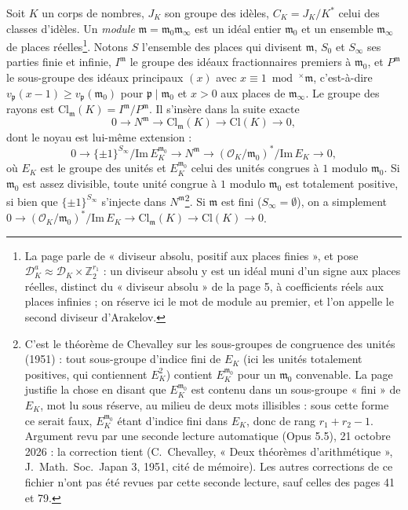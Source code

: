 \documentclass[11pt,a4paper]{article}
\begin{document}
Soit $K$ un corps de nombres, $J_K$ son groupe des idèles, $C_K = J_K/K^{*}$
celui des classes d'idèles. Un \emph{module} $\mathfrak{m} = \mathfrak{m}_0
\mathfrak{m}_\infty$ est un idéal entier $\mathfrak{m}_0$ et un ensemble
$\mathfrak{m}_\infty$ de places réelles\footnote{La page parle de « diviseur
absolu, positif aux places finies », et pose $\mathcal{D}^{a}_K \approx
\mathcal{D}_K \times \mathbb{Z}_2^{r_1}$ : un diviseur absolu y est un idéal
muni d'un signe aux places réelles, distinct du « diviseur absolu » de la
page 5, à coefficients réels aux places infinies ; on réserve ici le mot de
module au premier, et l'on appelle le second diviseur d'Arakelov.}. Notons $S$
l'ensemble des places qui divisent $\mathfrak{m}$, $S_0$ et $S_\infty$ ses
parties finie et infinie, $I^{\mathfrak{m}}$ le groupe des idéaux fractionnaires
premiers à $\mathfrak{m}_0$, et $P^{\mathfrak{m}}$ le sous-groupe des idéaux
principaux $(x)$ avec $x \equiv 1 \bmod^{\times} \mathfrak{m}$, c'est-à-dire
$v_{\mathfrak{p}}(x-1) \geq v_{\mathfrak{p}}(\mathfrak{m}_0)$ pour $\mathfrak{p}
\mid \mathfrak{m}_0$ et $x > 0$ aux places de $\mathfrak{m}_\infty$. Le groupe
des rayons est $\mathrm{Cl}_{\mathfrak{m}}(K) = I^{\mathfrak{m}}/P^{\mathfrak{m}}$.
Il s'insère dans la suite exacte
\[
0 \to N^{\mathfrak{m}} \to \mathrm{Cl}_{\mathfrak{m}}(K) \to \mathrm{Cl}(K) \to 0,
\]
dont le noyau est lui-même extension :
\[
0 \to \{\pm 1\}^{S_\infty}/\mathrm{Im}\,E^{\mathfrak{m}_0}_K \to N^{\mathfrak{m}}
\to (\mathcal{O}_K/\mathfrak{m}_0)^{*}/\mathrm{Im}\,E_K \to 0,
\]
où $E_K$ est le groupe des unités et $E^{\mathfrak{m}_0}_K$ celui des unités
congrues à $1$ modulo $\mathfrak{m}_0$. Si $\mathfrak{m}_0$ est assez divisible,
toute unité congrue à $1$ modulo $\mathfrak{m}_0$ est totalement positive, si
bien que $\{\pm 1\}^{S_\infty}$ s'injecte dans $N^{\mathfrak{m}}$\footnote{C'est
le théorème de Chevalley sur les sous-groupes de congruence des unités (1951) :
tout sous-groupe d'indice fini de $E_K$ (ici les unités totalement positives,
qui contiennent $E_K^{2}$) contient $E^{\mathfrak{m}_0}_K$ pour un
$\mathfrak{m}_0$ convenable. La page justifie la chose en disant que
$E^{\mathfrak{m}_0}_K$ est contenu dans un sous-groupe « fini » de $E_K$, mot lu
sous réserve, au milieu de deux mots illisibles : sous cette forme ce serait
faux, $E^{\mathfrak{m}_0}_K$ étant d'indice fini dans $E_K$, donc de rang $r_1 + r_2 - 1$. Argument revu par une seconde lecture automatique (Opus 5.5), 21 octobre 2026 : la correction tient (C.~Chevalley, « Deux théorèmes d'arithmétique », J.~Math.\ Soc.\ Japan 3, 1951, cité de mémoire). Les autres corrections de ce fichier n'ont pas été revues par cette seconde lecture, sauf celles des pages 41 et 79.}. Si $\mathfrak{m}$ est fini ($S_\infty = \emptyset$), on a
simplement $0 \to (\mathcal{O}_K/\mathfrak{m}_0)^{*}/\mathrm{Im}\,E_K \to
\mathrm{Cl}_{\mathfrak{m}}(K) \to \mathrm{Cl}(K) \to 0$.
\end{document}
